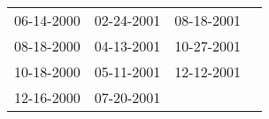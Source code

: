 \begin{supertabular}{llll}
 06-14-2000 &  02-24-2001 &  08-18-2001 \\
 08-18-2000 &  04-13-2001 &  10-27-2001 \\
 10-18-2000 &  05-11-2001 &  12-12-2001 \\
 12-16-2000 &  07-20-2001 &             \\
\end{supertabular}
